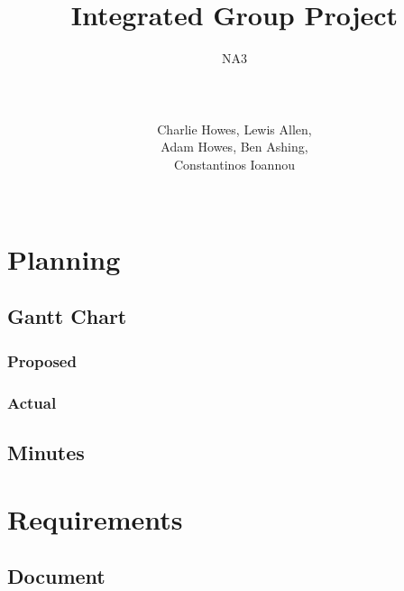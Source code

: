 \documentclass[a4paper]{article}
\title{Integrated Group Project}
\author{NA3
	\\ \rule{5cm}{0.4pt}
	\\Charlie Howes, Lewis Allen, 
    \\Adam Howes, Ben Ashing, 
    \\Constantinos Ioannou
    \\ \rule{5cm}{0.4pt}
} %
\begin{document}
\maketitle

\tableofcontents

\pagebreak

\section{Planning}
\subsection{Gantt Chart}
\subsubsection{Proposed}
\subsubsection{Actual} %

\subsection{Minutes}

\pagebreak

\section{Requirements}

\subsection{Document} %
\end{document}
